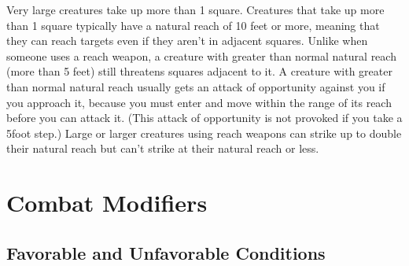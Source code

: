  Very large creatures take up more than 1 square. Creatures that take up more than 1 square typically have a natural reach of 10 feet or more, meaning that they can reach targets even if they aren't in adjacent squares. Unlike when someone uses a reach weapon, a creature with greater than normal natural reach (more than 5 feet) still threatens squares adjacent to it. A creature with greater than normal natural reach usually gets an attack of opportunity against you if you approach it, because you must enter and move within the range of its reach before you can attack it. (This attack of opportunity is not provoked if you take a 5\textendash foot step.) Large or larger creatures using reach weapons can strike up to double their natural reach but can't strike at their natural reach or less.

\pagebreak

\section{Combat Modifiers}

\subsection{Favorable and Unfavorable Conditions}

